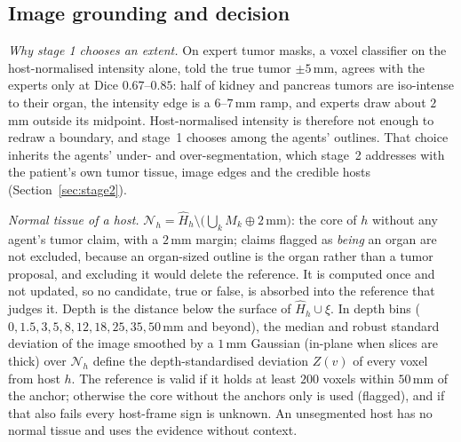 \documentclass[fleqn,10pt]{olplainarticle}
\begin{document}
\subsection{Image grounding and decision}
\label{sec:grounding_details}
\emph{Why stage 1 chooses an extent.} On expert tumor masks, a voxel classifier on the host-normalised intensity alone, told
the true tumor $\pm5$\,mm, agrees with the experts only at Dice $0.67$--$0.85$: half of kidney and pancreas tumors are
iso-intense to their organ, the intensity edge is a $6$--$7$\,mm ramp, and experts draw about $2$\,mm outside its midpoint.
Host-normalised intensity is therefore not enough to redraw a boundary, and stage~1 chooses among the agents' outlines.
That choice inherits the agents' under- and over-segmentation, which stage~2 addresses with the patient's own tumor tissue,
image edges and the credible hosts (Section~\ref{sec:stage2}).

\emph{Normal tissue of a host.} $\mathcal{N}_h=\hat H_h\setminus\bigl(\bigcup_k M_k\oplus2\,\mathrm{mm}\bigr)$: the core of
$h$ without any agent's tumor claim, with a $2$\,mm margin; claims flagged as \emph{being} an organ are not excluded, because an
organ-sized outline is the organ rather than a tumor proposal, and excluding it would delete the reference. It is computed once and not updated, so no candidate, true or
false, is absorbed into the reference that judges it. Depth is the distance below the surface of $\hat H_h\cup\xi$. In
depth bins ($0,1.5,3,5,8,12,18,25,35,50$\,mm and beyond), the median and robust standard deviation of the image smoothed by
a $1$\,mm Gaussian (in-plane when slices are thick) over $\mathcal{N}_h$ define the depth-standardised deviation $Z(v)$ of
every voxel from host $h$. The reference is valid if it holds at least $200$ voxels within $50$\,mm of the anchor; otherwise
the core without the anchors only is used (flagged), and if that also fails every host-frame sign is unknown. An
unsegmented host has no normal tissue and uses the evidence without context.
\end{document}
